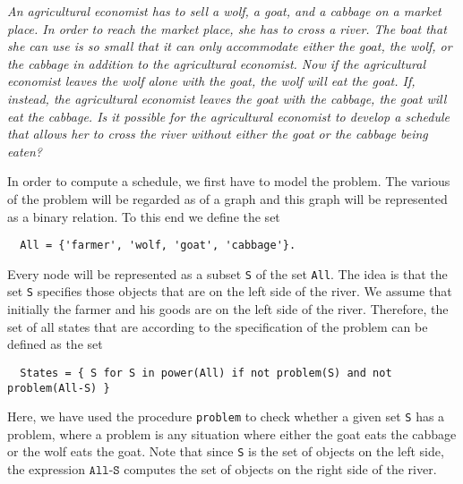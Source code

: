 \begin{minipage}[c]{16cm}
{\sl
An agricultural economist has to sell a wolf, a goat, and a cabbage on a market place.  In order to
reach the market place, she has to cross a river.  The boat that she can use is so small that it can
only accommodate either the goat, the wolf, or the cabbage in addition to the agricultural economist.
Now if the agricultural economist leaves the wolf alone with the goat, the wolf will eat the goat.
If, instead, the agricultural economist leaves the goat with the cabbage, the goat will eat the cabbage.
Is it possible for the agricultural economist to develop a schedule that allows her to cross the river
without either the goat or the cabbage being eaten?
}
\end{minipage}
\vspace*{0.3cm}

\noindent
In order to compute a schedule, we first have to model the problem.  The various  of the problem will
be regarded as  of a graph and this graph will be represented as a binary relation.
To this end we define the set
\begin{verbatim}
  All = {'farmer', 'wolf, 'goat', 'cabbage'}.
\end{verbatim}
Every node will be represented as a subset \texttt{S} of the set \texttt{All}.  The idea is that the set \texttt{S}
specifies those objects that are on the left side of the river.  We assume that initially the farmer and his goods
are on the left side of the river. 
Therefore, the set of all states that are  according to the specification of the problem can be defined
as the set 
\begin{verbatim}
  States = { S for S in power(All) if not problem(S) and not problem(All-S) }
\end{verbatim}
Here, we have used the procedure \texttt{problem} to check whether a given set \texttt{S} has a problem,
where a problem is any situation where either the goat eats the cabbage or the wolf eats the goat.
Note that since \texttt{S} is the set of objects on the left side, the expression $\texttt{All-S}$
computes the set of objects on the right side of the river.

